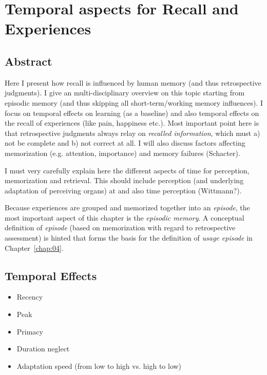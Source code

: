 \chapter{Temporal aspects for Recall and Experiences}\label{chap:03}
\section*{Abstract}
Here I present how recall is influenced by human memory (and thus retrospective judgments).
I give an multi-disciplinary overview on this topic starting from episodic memory (and thus skipping all short-term/working memory influences).
I focus on temporal effects on learning (as a baseline) and also temporal effects on the recall of experiences (like pain, happiness etc.).
Most important point here is that retrospective judgments always relay on \textit{recalled information}, which must a) not be complete and b) not correct at all.
I will also discuss factors affecting memorization (e.g. attention, importance) and memory failures (Schacter).

I must very carefully explain here the different aspects of time for perception, memorization and retrieval.
This should include perception (and underlying adaptation of perceiving organs) at and also time perception (Wittmann?).


Because experiences are grouped and memorized together into an \textit{episode}, the most important aspect of this chapter is the \textit{episodic memory}.
A conceptual definition of \emph{episode} (based on memorization with regard to retrospective assessment) is hinted that forms the basis for the definition of \textit{usage episode} in Chapter~\ref{chap:04}.

\section{Temporal Effects}
\begin{itemize}
\item Recency
\item Peak
\item Primacy
\item Duration neglect
\item Adaptation speed (from low to high vs. high to low)
\end{itemize}

%

